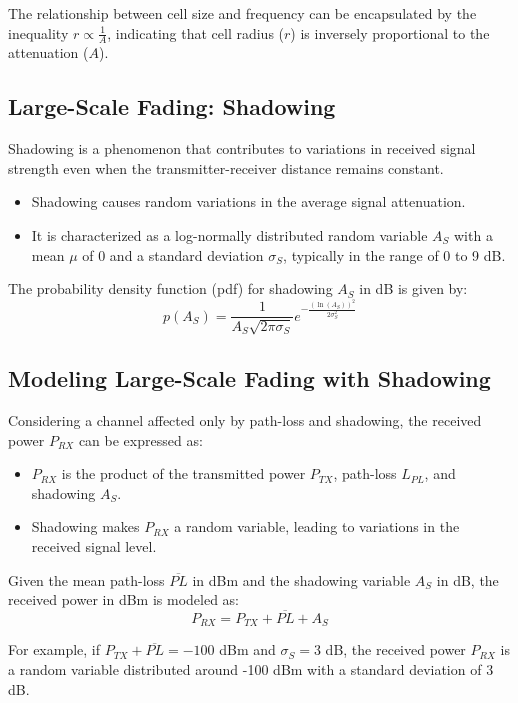 The relationship between cell size and frequency can be encapsulated by the inequality \(r \propto \frac{1}{A}\), indicating that cell radius (\(r\)) is inversely proportional to the attenuation (\(A\)).

\subsection*{Large-Scale Fading: Shadowing}

Shadowing is a phenomenon that contributes to variations in received signal strength even when the transmitter-receiver distance remains constant.

\begin{itemize}
    \item Shadowing causes random variations in the average signal attenuation.
    \item It is characterized as a log-normally distributed random variable \( A_S \) with a mean \( \mu \) of 0 and a standard deviation \( \sigma_S \), typically in the range of 0 to 9 dB.
\end{itemize}

The probability density function (pdf) for shadowing \( A_S \) in dB is given by:
\[
p(A_S) = \frac{1}{A_S \sqrt{2\pi \sigma_S}} e^{-\frac{(\ln(A_S))^2}{2\sigma_S^2}}
\]

\subsection*{Modeling Large-Scale Fading with Shadowing}

Considering a channel affected only by path-loss and shadowing, the received power \( P_{RX} \) can be expressed as:

\begin{itemize}
    \item \( P_{RX} \) is the product of the transmitted power \( P_{TX} \), path-loss \( L_{PL} \), and shadowing \( A_S \).
    \item Shadowing makes \( P_{RX} \) a random variable, leading to variations in the received signal level.
\end{itemize}

Given the mean path-loss \( \overline{PL} \) in dBm and the shadowing variable \( A_S \) in dB, the received power in dBm is modeled as:
\[
P_{RX} = P_{TX} + \overline{PL} + A_S
\]

For example, if \( P_{TX} + \overline{PL} = -100 \) dBm and \( \sigma_S = 3 \) dB, the received power \( P_{RX} \) is a random variable distributed around -100 dBm with a standard deviation of 3 dB.

